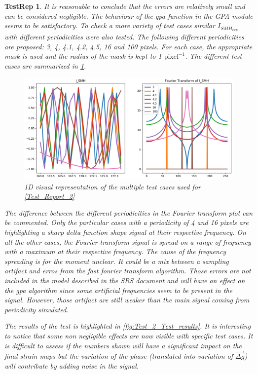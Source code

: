 \documentclass[12pt, titlepage]{article}
\newtheorem{TestRep}{TestRep}
\begin{document}
\begin{TestRep}
It is reasonable to conclude that the errors are relatively small and can be considered negligible. The behaviour of the gpa function in the GPA module seems to be satisfactory. To check a more variety of test cases similar $I_{SMH_{exp}}$ with different periodicities were also tested. The following different periodicities are proposed: 3, 4, 4.1, 4.2, 4.5, 16 and 100 pixels. For each case, the appropriate mask is used and the radius of the mask is kept to 1 $\text{pixel}^{-1}$. The different test cases are summarized in \cref{fig:Test_2_Test_cases}. 

\begin{figure}[H]
\begin{center}
\includegraphics[scale=0.5]{Figures/Test_2_test_cases.png}
\caption{1D visual representation of the multiple test cases used for \cref{Test_Report_2}}
\label{fig:Test_2_Test_cases}
\end{center}
\end{figure}

The difference between the different periodicities in the Fourier transform plot can be commented. Only the particular cases with a periodicity of 4 and 16 pixels are highlighting a sharp delta function shape signal at their respective frequency. On all the other cases, the Fourier transform signal is spread on a range of frequency with a maximum at their respective frequency. The cause of the frequency spreading is for the moment unclear. It could be a mix between a sampling artifact and erros from the fast fourier transform algorithm. Those errors are not included in the model described in the SRS document and will have an effect on the gpa algorithm since some artificial frequencies seem to be present in the signal. However, those artifact are still weaker than the main signal coming from periodicity simulated.\medskip

The results of the test is highlighted in \cref{fig:Test_2_Test_results}. It is interesting to notice that some non negligible effects are now visible with specific test cases. It is difficult to assess if the numbers shown will have a significant impact on the final strain maps but the variation of the phase (translated into variation of $\overrightarrow{\Delta g}$) will contribute by adding noise in the signal.


\end{TestRep}
\end{document}
